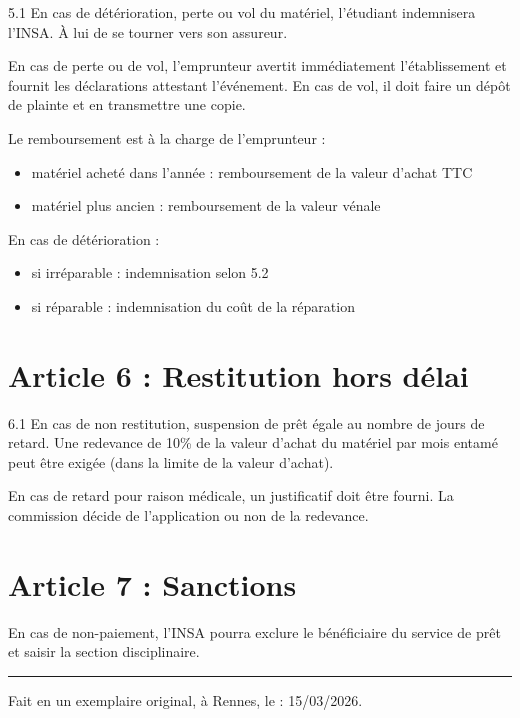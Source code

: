 \documentclass[12pt,a4paper]{article}
\begin{document}
5.1 En cas de détérioration, perte ou vol du matériel, l’étudiant indemnisera l’INSA. À lui de se tourner vers son assureur.

 En cas de perte ou de vol, l’emprunteur avertit immédiatement l’établissement et fournit les déclarations attestant l’événement.  
En cas de vol, il doit faire un dépôt de plainte et en transmettre une copie.  

Le remboursement est à la charge de l’emprunteur :
\begin{itemize}
    \item matériel acheté dans l’année : remboursement de la valeur d’achat TTC
    \item matériel plus ancien : remboursement de la valeur vénale
\end{itemize}

 En cas de détérioration :
\begin{itemize}
    \item si irréparable : indemnisation selon 5.2
    \item si réparable : indemnisation du coût de la réparation
\end{itemize}

\section*{Article 6 : Restitution hors délai}

6.1 En cas de non restitution, suspension de prêt égale au nombre de jours de retard.  
Une redevance de 10\% de la valeur d’achat du matériel par mois entamé peut être exigée (dans la limite de la valeur d’achat).

 En cas de retard pour raison médicale, un justificatif doit être fourni. La commission décide de l’application ou non de la redevance.

\section*{Article 7 : Sanctions}

En cas de non-paiement, l’INSA pourra exclure le bénéficiaire du service de prêt et saisir la section disciplinaire.

\vspace{0.5cm}
\rule{\linewidth}{1pt}
\vspace{0.5cm}

Fait en un exemplaire original, à Rennes, le : 15/03/2026.
\end{document}
